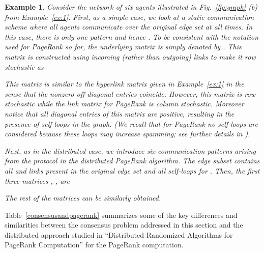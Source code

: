 \documentclass[11pt,draftcls,onecolumn]{IEEEtran}
\newtheorem{example}[theorem]{Example}
\newcommand{\End}{\hfill \mbox{}}
\begin{document}
\begin{example}\label{ex:consensus}\rm
Consider the network of six agents illustrated in Fig.~\ref{fig:graph} (b) from Example~\ref{ex:1}. 
First, as a simple case, we look at a static communication scheme
where all agents communicate over the original edge set  at all times.
In this case, there is only one pattern  and hence . 
To be consistent with the notation used for PageRank so far, 
the underlying matrix is simply denoted by . This matrix is constructed 
using incoming (rather than outgoing) links to make it row stochastic as

This matrix is similar to the hyperlink matrix given in Example~\ref{ex:1} in the sense
that the nonzero off-diagonal entries coincide. However, this matrix is row stochastic
while the link matrix for PageRank is column stochastic.
Moreover notice that all diagonal entries of this matrix are positive,
resulting in the presence of self-loops in the graph.
(We recall that for PageRank no self-loops are considered 
because these loops may increase spamming; 
see further details in \cite{LanMey:06,AndBorHop:07}).


Next, as in the distributed case, we introduce six communication patterns 
arising from the protocol in the distributed PageRank algorithm.
The edge subset  contains all  and 
links present in the original edge set  and all self-loops  for .
Then, the first three matrices , , are

The rest of the matrices can be similarly obtained.

\End
\end{example}

\medskip



Table~\ref{consensusandpagerank}
summarizes some of the key differences and similarities between the consensus
problem addressed in this section and the distributed approach studied 
in ``Distributed Randomized Algorithms for PageRank Computation''
for the PageRank computation.
\end{document}
